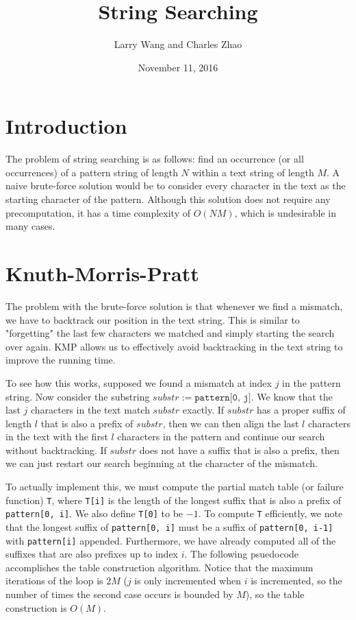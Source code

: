 \documentclass[11pt]{article}
\title{String Searching}
\author{Larry Wang and Charles Zhao}
\date{November 11, 2016}
\begin{document}
\maketitle

\section{Introduction}
The problem of string searching is as follows: find an occurrence (or all occurrences) of a pattern string of length $N$ within a text string of length $M$. A naive brute-force solution would be to consider every character in the text as the starting character of the pattern. Although this solution does not require any precomputation, it has a time complexity of $O(NM)$, which is undesirable in many cases. 


\section{Knuth-Morris-Pratt}
The problem with the brute-force solution is that whenever we find a mismatch, we have to backtrack our position in the text string. This is similar to "forgetting" the last few characters we matched and simply starting the search over again. KMP allows us to effectively avoid backtracking in the text string to improve the running time. 

To see how this works, supposed we found a mismatch at index $j$ in the pattern string. Now consider the substring $substr := \texttt{pattern[0, j]}$. We know that the last $j$ characters in the text match $substr$ exactly. If $substr$ has a proper suffix of length $l$ that is also a prefix of $substr$, then we can then align the last $l$ characters in the text with the first $l$ characters in the pattern and continue our search without backtracking. If $substr$ does not have a suffix that is also a prefix, then we can just restart our search beginning at the character of the mismatch. 

To actually implement this, we must compute the partial match table (or failure function) \texttt{T}, where \texttt{T[i]} is the length of the longest suffix that is also a prefix of \texttt{pattern[0, i]}. We also define \texttt{T[0]} to be $-1$. To compute \texttt{T} efficiently, we note that the longest suffix of \texttt{pattern[0, i]} must be a suffix of \texttt{pattern[0, i-1]} with \texttt{pattern[i]} appended. Furthermore, we have already computed all of the suffixes that are also prefixes up to index $i$. The following psuedocode accomplishes the table construction algorithm. Notice that the maximum iterations of the loop is $2M$ ($j$ is only incremented when $i$ is incremented, so the number of times the second case occurs is bounded by $M$), so the table construction is $O(M)$. 
\end{document}
